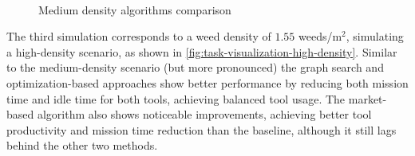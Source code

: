 \begin{figure}[htb]
    \myfloatalign
     \quad
     \\
    \caption{Medium density algorithms comparison}\label{fig:results-medium-density}
\end{figure}

The third simulation corresponds to a weed density of $1.55$ weeds/m$^2$, simulating a high-density scenario, as shown in \autoref{fig:task-visualization-high-density}. Similar to the medium-density scenario (but more pronounced) the graph search and optimization-based approaches show better performance by reducing both mission time and idle time for both tools, achieving balanced tool usage. The market-based algorithm also shows noticeable improvements, achieving better tool productivity and mission time reduction than the baseline, although it still lags behind the other two methods.

